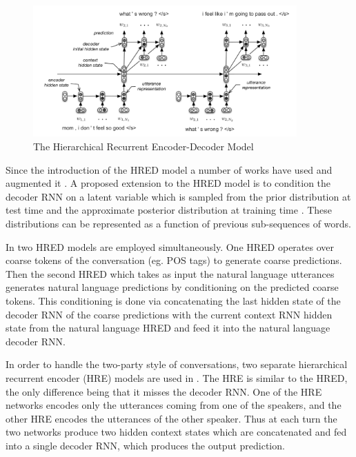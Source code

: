 \documentclass[12pt]{article}
\begin{document}
\begin{figure}[H]
	\label{fig:HRED}
	\centering
	\includegraphics[width=0.9\textwidth]{pics/HRED.png}
	\caption{The Hierarchical Recurrent Encoder-Decoder Model \cite{Serban:2015}}
\end{figure}
Since the introduction of the HRED model a number of works have used and augmented it \cite{Serban_VHRED:2017,Serban_MrRNN:2017,Serban:2017,Shen:2017,Li_adversarial:2017}. A proposed extension to the HRED model is to condition the decoder RNN on a latent variable which is sampled from the prior distribution at test time and the approximate posterior distribution at training time \cite{Serban_VHRED:2017}. These distributions can be represented as a function of previous sub-sequences of words. 

In \cite{Serban_MrRNN:2017} two HRED models are employed simultaneously. One HRED operates over coarse tokens of the conversation (eg. POS tags) to generate coarse predictions. Then the second HRED which takes as input the natural language utterances generates natural language predictions by conditioning on the predicted coarse tokens. This conditioning is done via concatenating the last hidden state of the decoder RNN of the coarse predictions with the current context RNN hidden state from the natural language HRED and feed it into the natural language decoder RNN.

In order to handle the two-party style of conversations, two separate hierarchical recurrent encoder (HRE) models are used in \cite{Shen:2017}. The HRE is similar to the HRED, the only difference being that it misses the decoder RNN. One of the HRE networks encodes only the utterances coming from one of the speakers, and the other HRE encodes the utterances of the other speaker. Thus at each turn the two networks produce two hidden context states which are concatenated and fed into a single decoder RNN, which produces the output prediction.
\end{document}
